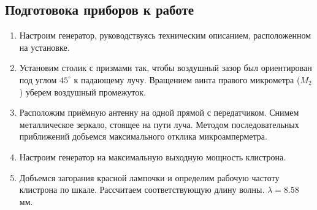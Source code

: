 \documentclass[a4paper, 12pt]{article}
\begin{document}
	\subsection{Подготовока приборов к работе}
	\begin{enumerate}
		\item Настроим генератор, руководствуясь техническим описанием, расположенном на установке.
		\item Установим столик с призмами так, чтобы воздушный зазор был ориентирован под углом $45^\circ$ к падающему лучу. Вращением винта правого микрометра ($M_2$) уберем воздушный промежуток.
		\item Расположим приёмную антенну на одной прямой с передатчиком. Снимем металлическое зеркало, стоящее на пути луча. Методом последовательных приближений добьемся максимального отклика микроамперметра.
		\item Настроим генератор на максимальную выходную мощность клистрона.
		\item Добъемся загорания красной лампочки и определим рабочую частоту клистрона по шкале. Рассчитаем соответствующую длину волны.
		$\lambda=8.58$ мм.
	\end{enumerate}
\end{document}

